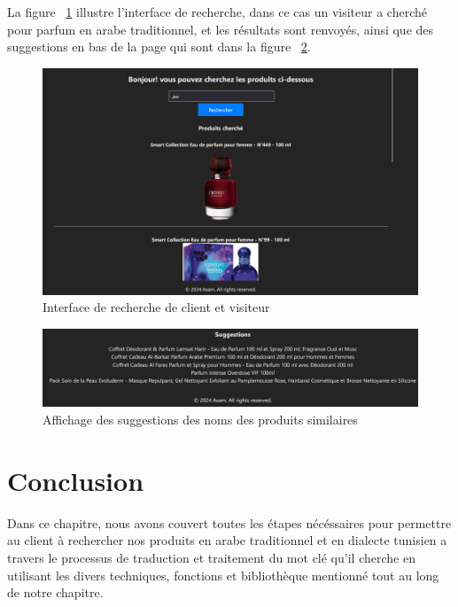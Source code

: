 \noindent
La figure ~\ref{fig:interfacerecherche} illustre l'interface de recherche, dans ce cas un visiteur a cherché pour parfum en arabe traditionnel, et les résultats sont renvoyés, ainsi que des suggestions en bas de la page qui sont dans la figure ~\ref{fig:suggestions}.


\begin{figure}[H]
	\centering
	\includegraphics[width=1\textwidth]{logos/interfacerecherche.png}
	\caption{Interface de recherche de client et visiteur}
	\label{fig:interfacerecherche}
\end{figure}

\begin{figure}[H]
	\centering
	\includegraphics[width=1\textwidth]{logos/suggestions.png}
	\caption{Affichage des suggestions des noms des produits similaires}
	\label{fig:suggestions}
\end{figure}


\section{Conclusion}
\noindent
Dans ce chapitre, nous avons couvert toutes les étapes nécéssaires pour permettre au client à rechercher nos produits en arabe traditionnel et en dialecte tunisien a travers le processus de traduction et traitement du mot clé qu'il cherche en utilisant les divers techniques, fonctions et bibliothèque mentionné tout au long de notre chapitre.